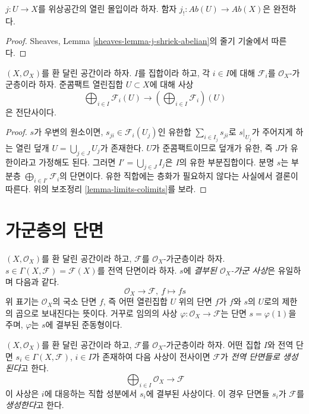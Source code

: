 \begin{lemma}
\label{lemma-j-shriek-exact}
$j : U \to X$를 위상공간의 열린 몰입이라 하자. 함자
$j_! : \textit{Ab}(U) \to \textit{Ab}(X)$은 완전하다.
\end{lemma}

\begin{proof}
Sheaves, Lemma \ref{sheaves-lemma-j-shriek-abelian}의 줄기 기술에서 따른다.
\end{proof}

\begin{lemma}
\label{lemma-section-direct-sum-quasi-compact}
$(X, \mathcal{O}_X)$를 환 달린 공간이라 하자. $I$를 집합이라 하고,
각 $i \in I$에 대해 $\mathcal{F}_i$를 $\mathcal{O}_X$-가군층이라 하자.
준콤팩트 열린집합 $U \subset X$에 대해 사상
$$
\bigoplus\nolimits_{i \in I} \mathcal{F}_i(U)
\longrightarrow
\left(\bigoplus\nolimits_{i \in I} \mathcal{F}_i\right)(U)
$$
은 전단사이다.
\end{lemma}

\begin{proof}
$s$가 우변의 원소이면, $s_{ji} \in \mathcal{F}_i(U_j)$인 유한합
$\sum_{i \in I_j} s_{ji}$로 $s|_{U_j}$가 주어지게 하는 열린 덮개
$U = \bigcup_{j \in J} U_j$가 존재한다. $U$가 준콤팩트이므로 덮개가 유한,
즉 $J$가 유한이라고 가정해도 된다. 그러면
$I' = \bigcup_{j \in J} I_j$은 $I$의 유한 부분집합이다. 분명 $s$는 부분층
$\bigoplus_{i \in I'} \mathcal{F}_i$의 단면이다. 유한 직합에는 층화가 필요하지
않다는 사실에서 결론이 따른다. 위의 보조정리 \ref{lemma-limits-colimits}를 보라.
\end{proof}



\section{가군층의 단면}
\label{section-sections}

\noindent
$(X, \mathcal{O}_X)$를 환 달린 공간이라 하고, $\mathcal{F}$를
$\mathcal{O}_X$-가군층이라 하자. $s \in \Gamma(X, \mathcal{F}) = \mathcal{F}(X)$를
전역 단면이라 하자. $s$에 {\it 결부된 $\mathcal{O}_X$-가군 사상}은 유일하며
다음과 같다.
$$
\mathcal{O}_X \longrightarrow \mathcal{F}, \ f \longmapsto fs
$$
위 표기는 $\mathcal{O}_X$의 국소 단면 $f$, 즉 어떤 열린집합 $U$ 위의 단면
$f$가 $f$와 $s$의 $U$로의 제한의 곱으로 보내진다는 뜻이다. 거꾸로 임의의 사상
$\varphi : \mathcal{O}_X \to \mathcal{F}$는 단면 $s = \varphi(1)$을 주며,
$\varphi$는 $s$에 결부된 준동형이다.

\begin{definition}
\label{definition-globally-generated}
$(X, \mathcal{O}_X)$를 환 달린 공간이라 하고, $\mathcal{F}$를
$\mathcal{O}_X$-가군층이라 하자. 어떤 집합 $I$와 전역 단면
$s_i \in \Gamma(X, \mathcal{F})$, $i \in I$가 존재하여 다음 사상이
전사이면 $\mathcal{F}$가 {\it 전역 단면들로 생성된다}고 한다.
$$
\bigoplus\nolimits_{i \in I}
\mathcal{O}_X \longrightarrow \mathcal{F}
$$
이 사상은 $i$에 대응하는 직합 성분에서 $s_i$에 결부된 사상이다.
이 경우 단면들 $s_i$가 $\mathcal{F}$를 {\it 생성한다}고 한다.
\end{definition}

